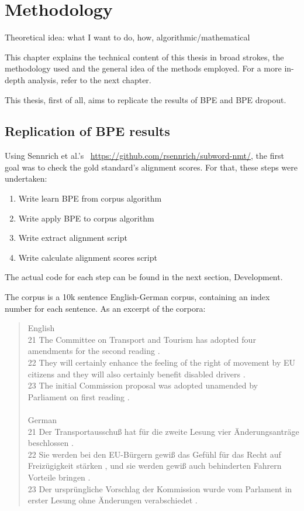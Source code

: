 %
%

\chapter{Methodology}\label{sec:methodology}

Theoretical idea: what I want to do, how, algorithmic/mathematical

This chapter explains the technical content of this thesis in broad strokes, the methodology used and the general idea of the methods employed. For a more in-depth analysis, refer to the next chapter.

This thesis, first of all, aims to replicate the results of BPE and BPE dropout.

\section{Replication of BPE results}

Using Sennrich et al.'s~\cite{sennrich2015neural} \href{code on Github}{https://github.com/rsennrich/subword-nmt/}, the first goal was to check the gold standard's alignment scores. For that, these steps were undertaken:

\begin{enumerate}
	\item Write learn BPE from corpus algorithm
	\item Write apply BPE to corpus algorithm
	\item Write extract alignment script
	\item Write calculate alignment scores script
\end{enumerate}

The actual code for each step can be found in the next section, Development.

The corpus is a 10k sentence English-German corpus, containing an index number for each sentence. As an excerpt of the corpora:

\begin{quote}
	English\\
	21	The Committee on Transport and Tourism has adopted four amendments for the second reading .\\
	22	They will certainly enhance the feeling of the right of movement by EU citizens and they will also certainly benefit disabled drivers .\\
	23	The initial Commission proposal was adopted unamended by Parliament on first reading .\\\\
	German\\
	21	Der Transportausschuß hat für die zweite Lesung vier Änderungsanträge beschlossen .\\
	22	Sie werden bei den EU-Bürgern gewiß das Gefühl für das Recht auf Freizügigkeit stärken , und sie werden gewiß auch behinderten Fahrern Vorteile bringen .\\
	23	Der ursprüngliche Vorschlag der Kommission wurde vom Parlament in erster Lesung ohne Änderungen verabschiedet .
\end{quote}

